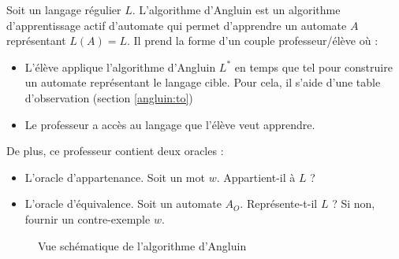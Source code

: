 Soit un langage régulier $L$. L'algorithme d'Angluin\cite{Angluin87} est un algorithme d'apprentissage actif d'automate qui permet d'apprendre un automate $A$ représentant $L(A)=L$. Il prend la forme d'un couple professeur/élève où :
\begin{itemize}
	\item L'élève applique l'algorithme d'Angluin $L^*$ en temps que tel pour construire un automate représentant le langage cible. Pour cela, il s'aide d'une table d'observation (section \ref{angluin:to})
	\item Le professeur a accès au langage que l'élève veut apprendre.
\end{itemize}

De plus, ce professeur contient deux oracles :
\begin{itemize}
	\item L'oracle d'appartenance. Soit un mot $w$. Appartient-il à $L$ ?
	\item L'oracle d'équivalence. Soit un automate $A_O$. Représente-t-il $L$ ? Si non, fournir un contre-exemple $w$.
\end{itemize}

\begin{figure}[H]
	\centering
{}
\caption{Vue schématique de l'algorithme d'Angluin}
\end{figure}

